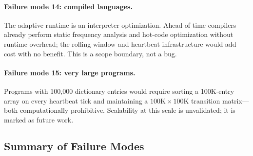 \paragraph{Failure mode 14: compiled languages.}
The adaptive runtime is an interpreter optimization. Ahead-of-time compilers
already perform static frequency analysis and hot-code optimization without
runtime overhead; the rolling window and heartbeat infrastructure would add
cost with no benefit. This is a scope boundary, not a bug.

\paragraph{Failure mode 15: very large programs.}
Programs with 100{,}000\raisebox{0.5ex}{+} dictionary entries would require
sorting a 100K-entry array on every heartbeat tick and maintaining a
$100\text{K} \times 100\text{K}$ transition matrix---both computationally
prohibitive. Scalability at this scale is unvalidated; it is marked as
future work.

\subsection{Summary of Failure Modes}
\label{sec:failure-summary}

